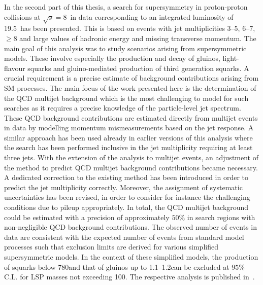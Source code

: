 In the second part of this thesis, a search for supersymmetry in proton-proton collisions at $\sqrt{s}=8$~\tev in data corresponding to an integrated luminosity of 19.5~\fbinv has been presented. This is based on events with jet multiplicities 3--5, 6--7, $\ge 8$ and large values of hadronic energy and missing transverse momentum. The main goal of this analysis was to study scenarios arising from supersymmetric models. These involve especially the production and decay of gluinos, light-flavour squarks and gluino-mediated production of third generation squarks. A crucial requirement is a precise estimate of background contributions arising from SM processes. The main focus of the work presented here is the determination of the QCD multijet background which is the most challenging to model for such searches as it requires a precise knowledge of the particle-level jet spectrum. These QCD background contributions are estimated directly from multijet events in data by modelling momentum mismeasurements based on the jet response. A similar approach has been used already in earlier versions of this analysis where the search has been performed inclusive in the jet multiplicity requiring at least three jets. With the extension of the analysis to multijet events, an adjustment of the method to predict QCD multijet background contributions became necessary. A dedicated correction to the existing method has been introduced in order to predict the jet multiplicity correctly. Moreover, the assignment of systematic uncertainties has been revised, in order to consider for instance the challenging conditions due to pileup appropriately. In total, the QCD multijet background could be estimated with a precision of approximately $50\%$ in search regions with non-negligible QCD background contributions. The observed number of events in data are consistent with the expected number of events from standard model processes such that exclusion limits are derived for various simplified supersymmetric models. In the context of these simplified models, the production of squarks below 780\gev and that of gluinos up to 1.1--1.2\tev can be excluded at $95\%$ C.L. for LSP masses not exceeding 100\gev. The respective analysis is published in~\cite{Chatrchyan:2014lfa}. \\
